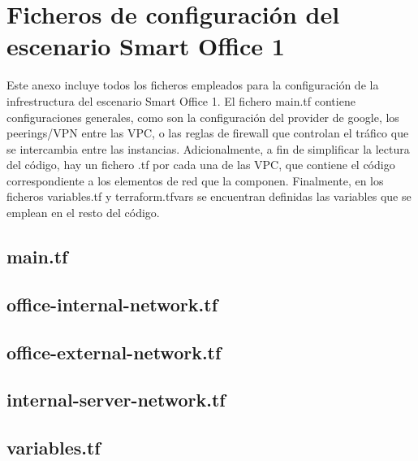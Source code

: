\appendix
\clearpage
\addappheadtotoc
\appendixpage


\chapter{Ficheros de configuración del escenario Smart Office 1} \label{sec:anxA}
  Este anexo incluye todos los ficheros empleados para la configuración de la infrestructura del escenario Smart Office 1. El fichero main.tf contiene configuraciones generales, como son la configuración del provider de google, los peerings/VPN entre las VPC, o las reglas de firewall que controlan el tráfico que se intercambia entre las instancias. Adicionalmente, a fin de simplificar la lectura del código, hay un fichero .tf por cada una de las VPC, que contiene el código correspondiente a los elementos de red que la componen. Finalmente, en los ficheros variables.tf y terraform.tfvars se encuentran definidas las variables que se emplean en el resto del código.

\section*{main.tf} 


\section*{office-internal-network.tf}

\clearpage

\section*{office-external-network.tf}


\section*{internal-server-network.tf}

\clearpage

\section*{variables.tf}


